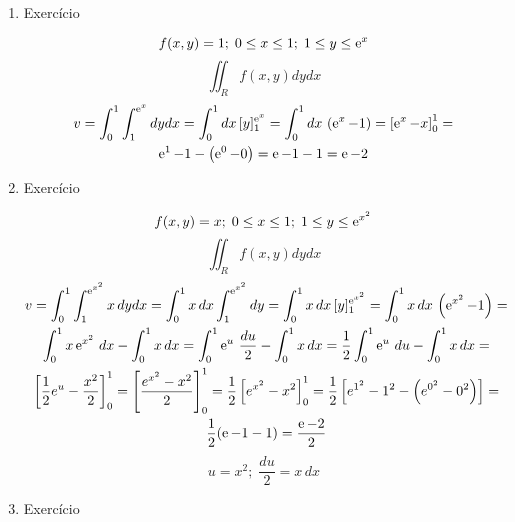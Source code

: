 \begin{enumerate}
	\item Exercício
	
	\begin{equation*}
		f(x,y) = 1;\; 0 \leq x \leq 1;\; 1 \leq y \leq \operatorname{e}^x	
	\end{equation*}
	\begin{equation*}
		\iint_R f(x, y) dy dx
	\end{equation*}
	\begin{gather*}
		v = \int_0^1 \int_1^{\operatorname{e}^x} dy dx = \int_0^1 dx\, [y]_1^{\operatorname{e}^x} = \int_0^1 dx\, \left(\operatorname{e}^x - 1\right) = \left[\operatorname{e}^x - x\right]_0^1 =\\ \operatorname{e}^1 - 1 - \left(\operatorname{e}^0 - 0\right) = \operatorname{e} - 1 - 1 = \operatorname{e} - 2	
	\end{gather*}
	
	\item Exercício
	
	\begin{equation*}
		f(x,y) = x;\; 0 \leq x \leq 1;\; 1 \leq y \leq \operatorname{e}^{x^2}
	\end{equation*}
	\begin{equation*}
		\iint_R f(x, y) dy dx
	\end{equation*}
	\begin{gather*}
		v = \int_0^1 \int_1^{\operatorname{e}^{x^2}} x\, dy dx = \int_0^1 x\,	dx \int_1^{\operatorname{e}^{x^2}} dy = \int_0^1 x\, dx\, [y]_1^{\operatorname{e}^{x^2}} = \int_0^1 x\, dx\, \left(\operatorname{e}^{x^2} - 1\right) =\\ \int_0^1 x\operatorname{e}^{x^2}\, dx - \int_0^1 x\,	dx = \int_0^1 \operatorname{e}^u\, \dfrac{du}{2} - \int_0^1 x\,	dx = \dfrac{1}{2}\int_0^1 \operatorname{e}^u\, du - \int_0^1 x\, dx =\\ \left[\dfrac{1}{2}e^u - \dfrac{x^2}{2}\right]_0^1 = \left[\dfrac{e^{x^2} - x^2}{2}\right]_0^1 = \dfrac{1}{2} \left[e^{x^2} - x^2\right]_0^1 = \dfrac{1}{2} \left[e^{1^2} - 1^2 - \left(e^{0^2} - 0^2\right)\right] =\\ \dfrac{1}{2}(\operatorname{e} - 1 - 1) = \dfrac{\operatorname{e} - 2}{2}
	\end{gather*}	
	\begin{equation*}
		u = x^2 ;\; \dfrac{du}{2} = x\, dx
	\end{equation*}
	
	\item Exercício
	

\end{enumerate}
